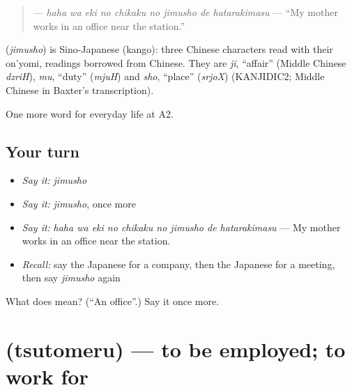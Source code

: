 \begin{quote}
\textbf{    } — \emph{haha wa eki no chikaku no jimusho de hatarakimasu} — \textquotedblleft{}My mother works in an office near the station.\textquotedblright{}
\end{quote}

\begin{cousinweb}
\textbf{} (\emph{jimusho}) is Sino-Japanese (kango): three Chinese characters read with their on'yomi, readings borrowed from Chinese. They are \emph{ji}, \textquotedblleft{}affair\textquotedblright{} (Middle Chinese \emph{dzriH}), \emph{mu}, \textquotedblleft{}duty\textquotedblright{} (\emph{mjuH}) and \emph{sho}, \textquotedblleft{}place\textquotedblright{} (\emph{srjoX}) (KANJIDIC2; Middle Chinese in Baxter's transcription).
\end{cousinweb}

\begin{grammarlens}[title={What you've built}]
One more word for everyday life at A2.
\end{grammarlens}

\subsection*{Your turn}
\begin{itemize}
\raggedright
  \item \emph{Say it:} \emph{jimusho}
  \item \emph{Say it:} \emph{jimusho}, once more
  \item \emph{Say it:} \emph{haha wa eki no chikaku no jimusho de hatarakimasu} — My mother works in an office near the station.
  \item \emph{Recall:} say the Japanese for a company, then the Japanese for a meeting, then say \emph{jimusho} again
\end{itemize}

\begin{tcolorbox}[breakable,colback=teal!4,colframe=teal!35!black,title={Before you move on}]
What does  mean? (\textquotedblleft{}An office\textquotedblright{}.) Say it once more.
\end{tcolorbox}
\section[\texorpdfstring{\ja{つとめる} (tsutomeru)}{つとめる (tsutomeru)}]{ (tsutomeru) — to be employed; to work for}

